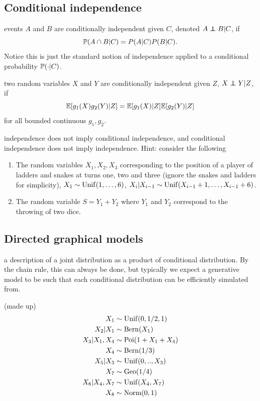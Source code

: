 \documentclass{article}
\begin{document}
\subsection{Conditional independence}

\newcommand\independent{\protect\mathpalette{\protect\independenT}{\perp}}
\def\independenT#1#2{\mathrel{\rlap{$#1#2$}\mkern2mu{#1#2}}}

 events $A$ and $B$ are conditionally independent given $C$, denoted $A \independent B | C$, if \[\P(A \cap B | C) = P(A | C) P(B | C).\] Notice this is just the standard  notion of independence applied to a conditional probability $\P(\cdot | C)$.

 two random variables $X$ and $Y$ are conditionally independent given $Z$, $X \independent Y | Z$, if \[ \E[g_1(X) g_2(Y)|Z] = \E[g_1(X)|Z] \E[g_2(Y)|Z]\] for all bounded continuous $g_1, g_2$.

 independence does not imply conditional independence, and conditional independence does not imply independence. Hint: consider the following 
\begin{enumerate}
	\item The random variables $X_1, X_2, X_3$ corresponding to the position of a player of ladders and snakes at turns one, two and three (ignore the snakes and ladders for simplicity), $X_1 \sim \Unif(1, \dots, 6)$, $X_i | X_{i-1} \sim \Unif(X_{i-1} + 1, \dots, X_{i-1} + 6)$.
	\item The random variable $S = Y_1 + Y_2$ where $Y_1$ and $Y_2$ correspond to the throwing of two dice. 
\end{enumerate}


\subsection{Directed graphical models}

 a description of a joint distribution as a product of conditional distribution. By the chain rule, this can always be done, but typically we expect a generative model to be such that each conditional distribution can be efficiently simulated from. 

 (made up)
\begin{align*}
	X_1 &\sim \Unif(0, 1/2, 1) \\
	X_2 | X_1 &\sim \Bern(X_1) \\
	X_3 | X_1, X_4 &\sim \Poi(1 + X_1 + X_4) \\
	X_4 &\sim \Bern(1/3) \\
	X_5 | X_3 &\sim \Unif(0, .., X_3) \\
	X_7 &\sim \text{Geo}(1/4) \\
	X_6 | X_4, X_7 &\sim \Unif(X_4, X_7) \\
	X_8 &\sim \text{Norm}(0, 1) 
\end{align*}
\end{document}
